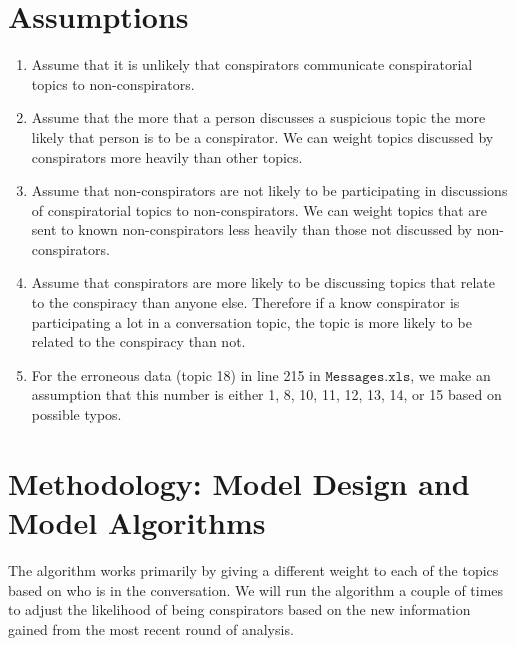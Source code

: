 \documentclass{icmmcm}
\begin{document}
\section{Assumptions}
\begin{enumerate}

\item Assume that it is unlikely that conspirators communicate
conspiratorial topics to non-conspirators.\label{cons_inside}

\item Assume that the more that a person discusses a suspicious topic the more likely that person is to be a conspirator.
 We can weight topics discussed by conspirators more heavily than other topics. 
\label{cons_involve}

\item 
Assume that non-conspirators are not likely to be participating in discussions of
conspiratorial topics to non-conspirators. 
 We can weight topics that are sent to known non-conspirators less heavily than
 those not discussed by non-conspirators.
\label{cons_not_involve}


\item Assume that conspirators are more likely to be discussing topics that relate to the conspiracy than anyone else.
Therefore if a know conspirator is participating a lot in a conversation topic,
the topic is more likely to be related to the conspiracy than not. \label{cons_topic}

\item For the erroneous data (topic 18) in line 215 in $\mathtt{Messages.xls}$, 
we make an assumption that this number is either 1, 8, 10, 11, 12, 13, 14, or 15
based on possible typos.
\end{enumerate}
\section{Methodology: Model Design and Model Algorithms}
The algorithm works primarily by giving a different weight to each of the 
topics based on who is in the conversation. We will run the algorithm
a couple of times to adjust the likelihood of being conspirators
based on the new information gained from the most 
recent round of analysis.
\end{document}
